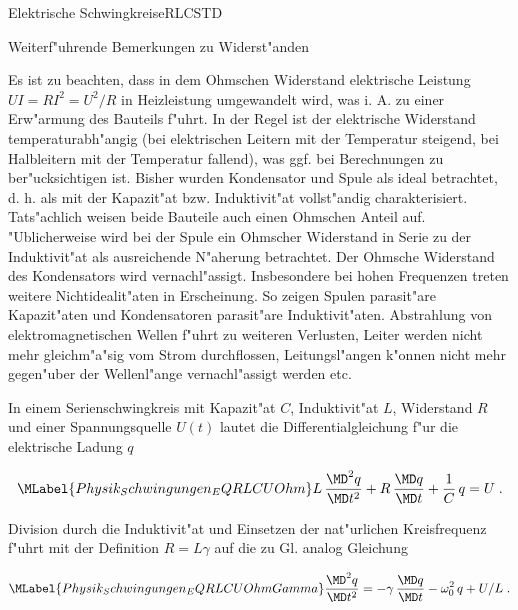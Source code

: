\begin{MXContent}{Elektrische Schwingkreise}{RLC}{STD}
{\begin{MHint}{Weiterf"uhrende Bemerkungen zu Widerst"anden}
  \end{MHint}
}

Es ist zu beachten, dass in dem Ohmschen Widerstand elektrische Leistung $U I = R I^2 = U^2 / R$ in Heizleistung umgewandelt wird, was i. A. zu einer Erw"armung des Bauteils f"uhrt. In der Regel ist der elektrische Widerstand temperaturabh"angig (bei elektrischen Leitern mit der Temperatur steigend, bei Halbleitern mit der Temperatur fallend), was ggf. bei Berechnungen zu ber"ucksichtigen ist. Bisher wurden Kondensator und Spule als ideal betrachtet, d. h. als mit der Kapazit"at bzw. Induktivit"at vollst"andig charakterisiert. Tats"achlich weisen beide Bauteile auch einen Ohmschen Anteil auf. "Ublicherweise wird bei der Spule ein Ohmscher Widerstand in Serie zu der Induktivit"at als ausreichende N"aherung betrachtet. Der Ohmsche Widerstand des Kondensators wird vernachl"assigt. Insbesondere bei hohen Frequenzen treten weitere Nichtidealit"aten in Erscheinung. So zeigen Spulen parasit"are Kapazit"aten und Kondensatoren parasit"are Induktivit"aten. Abstrahlung von elektromagnetischen Wellen f"uhrt zu weiteren Verlusten, Leiter werden nicht mehr gleichm"a"sig vom Strom durchflossen, Leitungsl"angen k"onnen nicht mehr gegen"uber der Wellenl"ange vernachl"assigt werden etc.

\begin{center}
\end{center}

\begin{MInfo}
In einem Serienschwingkreis mit Kapazit"at $C$, Induktivit"at $L$, Widerstand $R$ und einer Spannungsquelle $U(t)$ lautet die Differentialgleichung f"ur die elektrische Ladung $q$

\begin{equation}\MLabel{Physik_Schwingungen_EQRLCUOhm}
  L\, \frac{\MD^2 q }{\MD t^2} + R\, \frac{\MD q }{\MD t} + \frac{1}{C}\, q = U \; .
\end{equation}

Division durch die Induktivit"at und Einsetzen der nat"urlichen Kreisfrequenz f"uhrt mit der Definition $R=L\gamma$ auf die zu Gl. 
analog Gleichung

\begin{equation}\MLabel{Physik_Schwingungen_EQRLCUOhmGamma}
  \frac{\MD^2 q }{\MD t^2} = - \gamma \, \frac{\MD q }{\MD t} - \omega_0^2\,q +  U/L  \; .
\end{equation}



\end{MInfo}
\end{MXContent}
